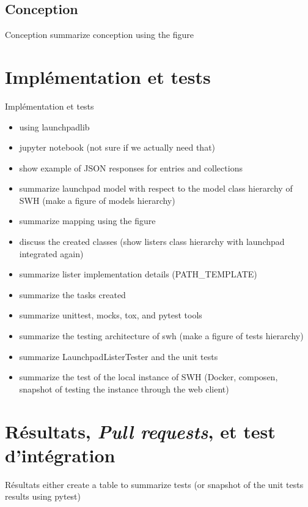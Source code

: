 \documentclass{beamer}
\begin{document}
  \subsection{Conception}
    \begin{frame}{Conception}
      summarize conception using the figure
    \end{frame}

\section{Implémentation et tests}
  \begin{frame}{Implémentation et tests}
    \begin{itemize}
      \item using launchpadlib
      \item jupyter notebook (not sure if we actually need that)
      \item show example of JSON responses for entries and collections
      \item summarize launchpad model with respect to the model class hierarchy of SWH (make a figure of models hierarchy)
      \item summarize mapping using the figure
      \item discuss the created classes (show listers class hierarchy with launchpad integrated again)
      \item summarize lister implementation details (PATH\_TEMPLATE)
      \item summarize the tasks created
      \item summarize unittest, mocks, tox, and pytest tools
      \item summarize the testing architecture of swh (make a figure of tests hierarchy)
      \item summarize LaunchpadListerTester and the unit tests
      \item summarize the test of the local instance of SWH (Docker, composen, snapshot of testing the instance through the web client)
    \end{itemize}
  \end{frame}

\section{Résultats, \textit{Pull requests}, et test d'intégration}
  \begin{frame}{Résultats}
    either create a table to summarize tests (or snapshot of the unit tests results using pytest)
  \end{frame}
\end{document}
